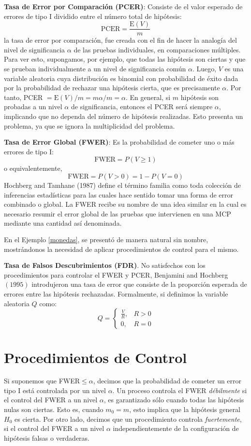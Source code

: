 \documentclass{article}
\theoremstyle{definition}
\begin{document}
\textbf{Tasa de Error por Comparación (PCER)}: Consiste de el valor esperado de errores de tipo I dividido entre el número total de hipótesis:
$$
\mathrm{PCER}=\frac{\mathrm{E}(V) }{m}
$$
la tasa de error por comparación, fue creada con el fin de hacer la analogía del nivel de significancia $\alpha$ de las pruebas individuales, en comparaciones múltiples. Para ver esto, supongamos, por ejemplo, que todas las hipótesis son ciertas y que se prueban individualmente a un nivel de significancia común $\alpha$. Luego, $V$ es una variable aleatoria cuya distribución es binomial con probabilidad de éxito dada por la probabilidad de rechazar una hipótesis cierta, que es precisamente $\alpha .$ Por tanto, PCER $=\mathrm{E}(V) / m=m \alpha / m=\alpha .$ En general, si $m$ hipótesis son probadas a un nivel $\alpha$ de significancia, entonces el PCER será siempre $\alpha$, implicando que no dependa del número de hipótesis realizadas. Esto presenta un problema, ya que se ignora la multiplicidad del problema.

\textbf{Tasa de Error Global (FWER)}: Es la probabilidad de cometer uno o más errores de tipo I:
$$
\mathrm{FWER}=P(V \geq 1)
$$
o equivalentemente,
$$
\mathrm{FWER}=P(V>0)=1-P(V=0)
$$
Hochberg and Tamhane (1987) define el término familia como toda colección de inferencias estadísticas para las cuales hace sentido tomar una forma de error combinado o global. La FWER recibe su nombre de una idea similar en la cual es necesario resumir el error global de las pruebas que intervienen en una MCP mediante una cantidad así denominada.

En el Ejemplo \ref{monedas}, se presentó de manera natural sin nombre, mostrándonos la necesidad de aplicar procedimientos de control para el mismo.

\textbf{Tasa de Falsos Descubrimientos (FDR)}. No satisfechos con los procedimientos para controlar el FWER y PCER, Benjamini and Hochberg $(1995)$ introdujeron una tasa de error que consiste de la proporción esperada de errores entre las hipótesis rechazadas. Formalmente, si definimos la variable aleatoria $Q$ como:
$$
Q=\left\{\begin{array}{ll}
	\frac{V}{R}, & R>0 \\
	0, & R=0
\end{array}\right.
$$

\section{Procedimientos de Control}
Si suponemos que FWER$\leq\alpha$, decimos que 	la probabilidad de cometer un error tipo I está controlada por un nivel $\alpha$.
Un proceso controla el FWER \textit{débilmente} si el control del FWER a un nivel $\alpha$, es garantizado sólo cuando todas las hipótesis  nulas son ciertas. Esto es, cuando $m_0=m$, esto implica que la hipótesis general $H_0$ es cierta. Por otro lado, decimos que un procedimiento controla \textit{fuertemente}, si el control del FWER a un nivel $\alpha$ independientemente de la configuración de hipótesis falsas o verdaderas.
\end{document}
